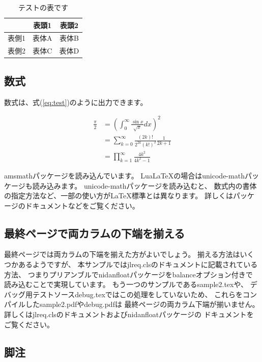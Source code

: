 \documentclass{FITpaper}
\begin{document}
\begin{table}
  \centering
  \begin{tabular}{c|cc}
    & 表頭1 & 表頭2 \\
    \hline
    表側1 & 表体A & 表体B \\
    表側2 & 表体C & 表体D \\
  \end{tabular}
  \caption{テストの表です}
  \label{tbl:test}
\end{table}

\subsection{数式}

数式は、式(\ref{eq:test})のように出力できます。

\begin{align}
  \frac{\pi}{2} &=
  \left( \int_{0}^{\infty} \frac{\sin x}{\sqrt{x}} dx \right)^2 \nonumber \\
  &= \sum_{k=0}^{\infty} \frac{(2k)!}{2^{2k}(k!)^2} \frac{1}{2k+1} \nonumber \\
  &= \prod_{k=1}^{\infty} \frac{4k^2}{4k^2 - 1}
  \label{eq:test}
\end{align}

amsmathパッケージを読み込んでいます。
Lua\LaTeX の場合はunicode-mathパッケージも読み込みます。
unicode-mathパッケージを読み込むと、
数式内の書体の指定方法など、一部の使い方が\LaTeX 標準とは異なります。
詳しくはパッケージのドキュメントなどをご覧ください。

\subsection{最終ページで両カラムの下端を揃える}

最終ページでは両カラムの下端を揃えた方がよいでしょう。
揃える方法はいくつかあるようですが、
本サンプルではjlreq.clsのドキュメントに記載されている方法、
つまりプリアンブルでnidanfloatパッケージをbalanceオプション付きで
読み込むことで実現しています。
もう一つのサンプルであるsample2.texや、
デバッグ用テストソースdebug.texではこの処理をしていないため、
これらをコンパイルしたsample2.pdfやdebug.pdfは
最終ページの両カラム下端が揃いません。
詳しくはjlreq.clsのドキュメントおよびnidanfloatパッケージの
ドキュメントをご覧ください。

\subsection{脚注}
\end{document}
